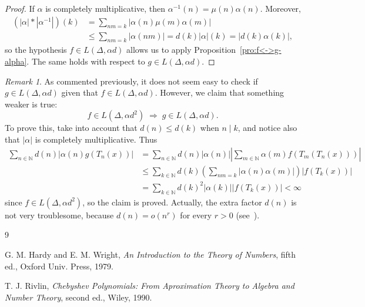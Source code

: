 \documentclass[10pt,a4paper]{amsart}
\theoremstyle{plain}
\theoremstyle{remark}
\newtheorem*{remark}{Remark} %
\newcommand{\N}{\mathbb{N}}
\newcommand{\numdiv}{d} %
\begin{document}
\begin{proof}
If $\alpha$ is completely multiplicative, then $\alpha^{-1}(n) =
\mu(n)\alpha(n)$. Moreover,
\begin{align*}
  (|\alpha|*|\alpha^{-1}|)(k) &= \sum_{nm=k} |\alpha(n)\mu(m)\alpha(m)| \\
  &\le \sum_{nm=k} |\alpha(nm)| = \numdiv(k)|\alpha|(k) = |\numdiv(k)\alpha(k)|,
\end{align*}
so the hypothesis $f \in L(\Delta,\alpha\numdiv)$ allows us to
apply Proposition~\ref{pro:f<->g-alpha}. The same holds with respect
to $g \in L(\Delta,\alpha\numdiv)$.
\end{proof}

\begin{remark}
As commented previously, it does not seem easy to check if
$g \in L(\Delta,\alpha\numdiv)$ given that
$f \in L(\Delta,\alpha\numdiv)$. However, we claim that something weaker is true:
\begin{equation*}
  f \in L(\Delta,\alpha\numdiv^2) \;\Rightarrow\;
  g \in L(\Delta,\alpha\numdiv).
\end{equation*}
To prove this, take into account that $\numdiv(n) \le \numdiv(k)$ when $n \mathrel{|} k$,
and notice also that $|\alpha|$ is completely multiplicative. 
Thus
\begin{align*}
\sum_{n \in \N} \numdiv(n)|\alpha(n) g(T_n(x))| 
&= \sum_{n \in \N} \numdiv(n)|\alpha(n)|
  \left|\sum_{m \in \N} \alpha(m) f(T_m(T_n(x))) \right| \\
&\le \sum_{k \in \N} \numdiv(k)
  \left(\sum_{nm = k} |\alpha(n) \alpha(m)| \right) |f(T_k(x))| \\
&= \sum_{k \in \N} \numdiv(k)^2 |\alpha(k)| |f(T_k(x))| < \infty
\end{align*}
since $f \in L(\Delta,\alpha\numdiv^2)$, so the claim is proved.
Actually, the extra factor $\numdiv(n)$ is not very troublesome,
because $\numdiv(n) = o(n^r)$ for every $r>0$
(see~\cite[Section~18.1, Theorem~15, p.~260]{Ha-Wr}).
\end{remark}


\begin{thebibliography}{9}

 G. M. Hardy and E. M. Wright,
\textit{An Introduction to the Theory of Numbers}, fifth ed.,
Oxford Univ. Press, 1979.

 T. J. Rivlin,
\textit{Chebyshev Polynomials:
From Aproximation Theory to Algebra and Number Theory}, second ed.,
Wiley, 1990.

\end{thebibliography}
\end{document}
